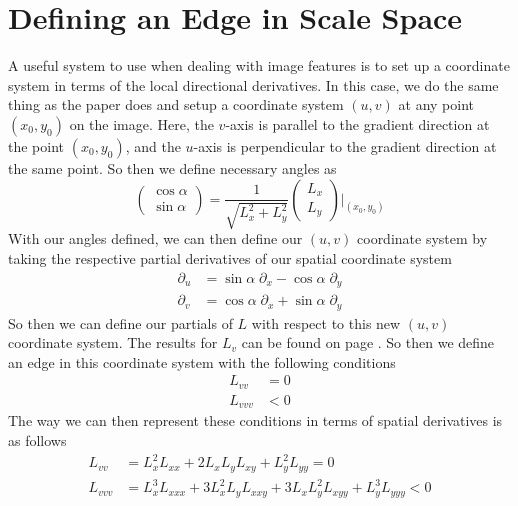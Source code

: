 \documentclass{article}
\begin{document}
\section{Defining an Edge in Scale Space}
A useful system to use when dealing with image features is to set up a coordinate system in terms of the local directional derivatives.
In this case, we do the same thing as the paper does and setup a coordinate system $(u,v)$ at any point $(x_0,y_0)$ on the image.
Here, the $v$-axis is parallel to the gradient direction at the point $(x_0, y_0)$, and the $u$-axis is perpendicular to the gradient direction at the same point. So then we define necessary angles as \cite{Lindeberg1998}
\begin{equation}
  \begin{pmatrix}
    \cos{\alpha} \\
    \sin{\alpha}
  \end{pmatrix}
  = \frac{1}{\sqrt{L_x^2+L_y^2}}
  \begin{pmatrix}
    L_x \\
    L_y
  \end{pmatrix}
  \Bigg|_{(x_0,y_0)}
\end{equation}
With our angles defined, we can then define our $(u,v)$ coordinate system by taking the respective partial derivatives of our spatial coordinate system
\begin{align}
  \partial_u &= \sin{\alpha}\; \partial_x - \cos{\alpha}\; \partial_y \\
  \partial_v &= \cos{\alpha}\; \partial_x + \sin{\alpha}\; \partial_y
\end{align}
So then we can define our partials of $L$ with respect to this new $(u,v)$ coordinate system. The results for $L_v$ can be found on page \pageref{t_v}. So then we define an edge in this coordinate system with the following conditions \cite{Lindeberg1998}
\begin{equation} \label{eq:c1}
  \begin{aligned}
    L_{vv} &= 0 \\
    L_{vvv} &< 0
  \end{aligned}
\end{equation}
The way we can then represent these conditions in terms of spatial derivatives is as follows \cite{Lindeberg1998}
\begin{equation}
  \begin{aligned}
    L_{vv} &= L_x^2L_{xx}+2L_xL_yL_{xy}+L_y^2L_{yy} = 0 \\
    L_{vvv} &= L_x^3L_{xxx} +3L_x^2L_yL_{xxy}+3L_xL_y^2L_{xyy}+L_y^3L_{yyy} < 0
  \end{aligned}
\end{equation}
\end{document}
